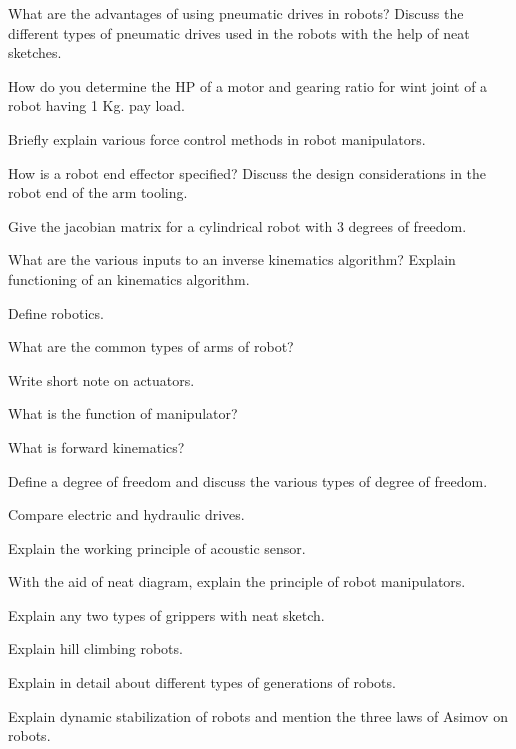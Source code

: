 \newpage \again

\item \iitem What are the advantages of using pneumatic drives in robots? Discuss
  the different types of pneumatic drives used in the robots with the help of neat
  sketches.
\Or
\item How do you determine the HP of a motor and gearing ratio for wint joint of a
  robot having 1 Kg. pay load.
\ene

\item \iitem Briefly explain various force control methods in robot manipulators.
\Or
\item How is a robot end effector specified? Discuss the design considerations in
  the robot end of the arm tooling.
\ene

\item \iitem Give the jacobian matrix for a cylindrical robot with 3 degrees of freedom.
\Or
\item What are the various inputs to an inverse kinematics
  algorithm? Explain functioning of an kinematics algorithm.
\ene

\markC
\ene

\newpage

\sub{\subj}
\maxtime

\partA

\iitem Define robotics.
\item What are the common types of arms of robot?
\item Write short note on actuators.
\item What is the function of manipulator?
\item What is forward kinematics?

\markA
\partB

\item Define a degree of freedom and discuss the various types of degree of freedom.
\item Compare electric and hydraulic drives.
\item Explain the working principle of acoustic sensor.
\item With the aid of neat diagram, explain the principle of robot manipulators.
\item Explain any two types of grippers with neat sketch.
\item Explain hill climbing robots.

\markB
\partC

\item \iitem Explain in detail about different types of generations of robots.
\Or
\item Explain dynamic stabilization of robots and mention the three laws of Asimov
  on robots.
\ene


